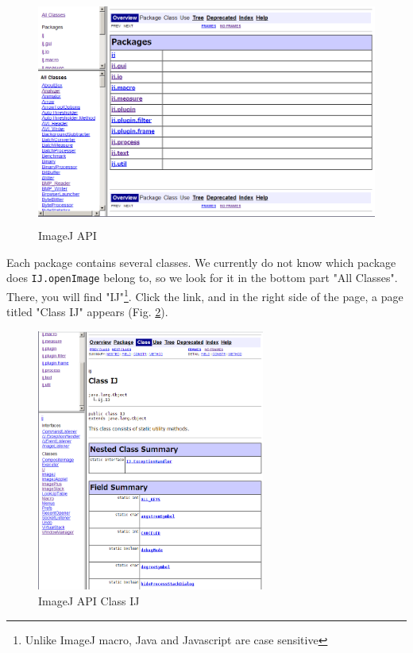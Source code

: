 \documentclass[11pt,a4paper,oneside]{report}
\newcommand{\ilcom}[1]{\texttt{\small#1}}
\begin{document}
\begin{figure}[htbp]
\begin{center}
\includegraphics[height=75mm]{fig2/IJAPItop.png}
\caption{ImageJ API}
\label{fig:IJAPItoppage}
\end{center}
\end{figure}


Each package contains several classes. 
We currently do not know which package does 
\ilcom{IJ.openImage} belong to, so we look for it in the bottom part "All Classes". 
There, you will find "IJ"\footnote{ Unlike ImageJ macro, Java and Javascript are case sensitive}. 
Click the link, and in the right side of the page, a page titled "Class IJ" appears 
(Fig. \ref{fig:IJAPClassIJ}). 

\begin{figure}[htbp]
\begin{center}
\includegraphics[width=75mm]{fig2/IJAPI_IJ.png}
\caption{ImageJ API Class IJ}
\label{fig:IJAPClassIJ}
\end{center}
\end{figure}
\end{document}
